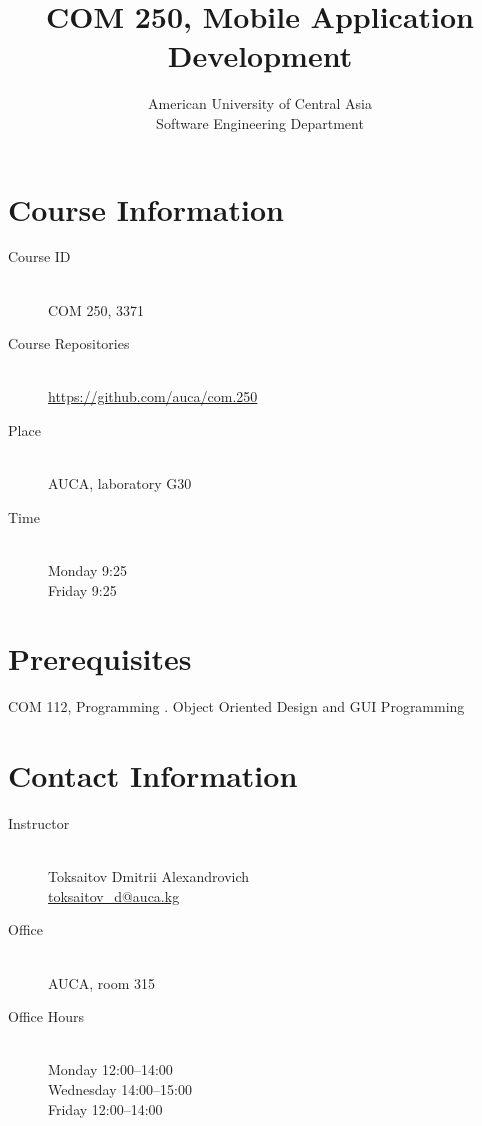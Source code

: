 \documentclass[12pt,a4paper,oneside]{article}
\newcommand{\R}[1]{\uppercase\expandafter{\romannumeral #1\relax}}
\begin{document}
    \title{COM 250, Mobile Application Development}
    \author{
        American University of Central Asia\\
        Software Engineering Department
    }
    \date{}
    \maketitle

    \section{Course Information}

        \begin{description}
            \item[Course ID]\hfill\\
                COM 250, 3371
            \item[Course Repositories]\hfill\\
                \url{https://github.com/auca/com.250}
            \item[Place]\hfill\\
                AUCA, laboratory G30
            \item[Time]\hfill\\
                Monday 9:25\\
                Friday 9:25
        \end{description}

    \section{Prerequisites}

        COM 112, Programming \R{2}. Object Oriented Design and GUI Programming

        \section{Contact Information}

            \begin{description}
                \item[Instructor]\hfill\\
                    Toksaitov Dmitrii Alexandrovich\\
                    \href{mailto:toksaitov_d@auca.kg}{toksaitov\_d@auca.kg}
                \item[Office]\hfill\\
                    AUCA, room 315
                \item[Office Hours]\hfill\\
                    Monday 12:00--14:00\\
                    Wednesday 14:00--15:00\\
                    Friday 12:00--14:00
            \end{description}
\end{document}
